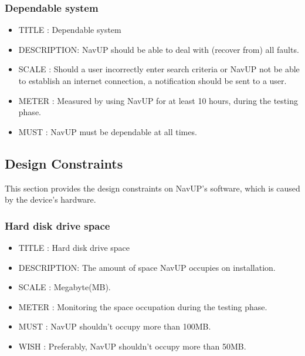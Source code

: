 \documentclass{article}
\begin{document}
			\subsubsection{Dependable system}
			\begin{itemize}
		    \item[]TITLE      : Dependable system
		    \item[]DESCRIPTION: NavUP should be able to deal with (recover from) all faults.
		    \item[]SCALE      : Should a user incorrectly enter search criteria or NavUP not be able to establish an internet connection, a notification should be sent to a user.
		    \item[]METER      : Measured by using NavUP for at least 10 hours, during the testing phase.
		    \item[]MUST       : NavUP must be dependable at all times.
		    \end{itemize}	
						
			\subsection{Design Constraints}\label{subsec:design constraints}	
				This section provides the design constraints on NavUP's software, which is caused by the device's hardware.
				
		    \subsubsection{Hard disk drive space}
			\begin{itemize}
		    \item[]TITLE      : Hard disk drive space
		    \item[]DESCRIPTION: The amount of space NavUP occupies on installation.
		    \item[]SCALE      : Megabyte(MB).
		    \item[]METER      : Monitoring the space occupation during the testing phase.
		    \item[]MUST       : NavUP shouldn't occupy more than 100MB.
		    \item[]WISH       : Preferably, NavUP shouldn't occupy more than 50MB.
		    \end{itemize}
		    
\end{document}
